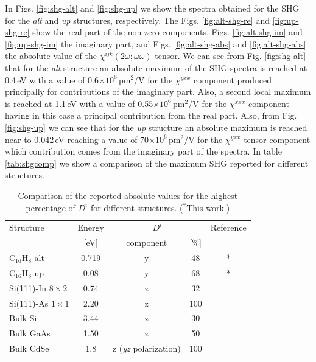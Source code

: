 \documentclass[aps,pra,11pt,tightenlines,showpacs,superscriptaddress,groupedaddress]{revtex4-1}
\newcommand{\di}{$D^{i}$}
\newcommand{\altstc}{C$_{16}$H$_{8}$-alt}
\newcommand{\upstc}{C$_{16}$H$_{8}$-up}
\begin{document}
In Figs. \ref{fig:shg-alt} and \ref{fig:shg-up} we show the spectra obtained
for the SHG for the \emph{alt} and \emph{up} structures, respectively. The
Figs. \ref{fig:alt-shg-re} and \ref{fig:up-shg-re} show the real part of the
non-zero components, Figs. \ref{fig:alt-shg-im} and \ref{fig:up-shg-im} the
imaginary part, and Figs. \ref{fig:alt-shg-abs} and \ref{fig:alt-shg-abs} the
absolute value of the $\chi^{ijk}(2\omega;\omega\omega) $ tensor. We can see
from Fig. \ref{fig:shg-alt} that for the \emph{alt} structure an absolute
maximum of the SHG spectra is reached at 0.4\,eV with a value of
0.6$\times10^{6} $\,pm$^{2}$/V for the $\chi^{yxx} $ component produced
principally for contributions of the imaginary part. Also, a second local
maximum is reached at 1.1\,eV with a value of 0.55$\times10^{6} $\,pm$^{2}$/V
for the $\chi^{xxx} $ component having in this case a principal contribution
from the real part. Also, from Fig. \ref{fig:shg-up} we can see that for the
\emph{up} structure an absolute maximum is reached near to 0.042\,eV reaching a
value of 70$\times10^{6} $\,pm$^{2}$/V for the $\chi^{yxx} $ tensor component
which contribution comes from the imaginary part of the spectra. In table
\ref{tab:shgcomp} we show a comparison of the maximum SHG reported for
different structures.


\begin{table}
    \caption{Comparison of the reported absolute values for the highest 
    percentage of {\di} for different structures. ($^{*}$This work.)}
    \label{tab:dacomp}
    \centering
    \begin{ruledtabular}
    \begin{tabular}{lcccc}
    Structure & Energy &  \multicolumn{2}{c}{\di} &  Reference\\
    \cline{3-4}
              & [eV]   & component & [\%] \\
    \hline
    {\altstc}               & 0.719 & y & 48 & *     \\
    {\upstc}                & 0.08  & y & 68 & *     \\
    Si(111)-In $8\times2$   & 0.74  & z & 32 & \cite{arzate2014optical}  \\
    Si(111)-As $1\times1$   & 2.20  & z & 100& \cite{mendoza2012optical} \\
    Bulk Si                 & 3.44  & z & 30 & \cite{nastos2007full}     \\
    Bulk GaAs               & 1.50  & z & 50 & \cite{nastos2007full} 
    \cite{bhat2005excitonic} \\
    Bulk CdSe               & 1.8   & z {\scriptsize (\emph{yz} polarization)} 
    & 100& \cite{nastos2007full}\\
    \end{tabular}
    \end{ruledtabular}
\end{table}
\end{document}
